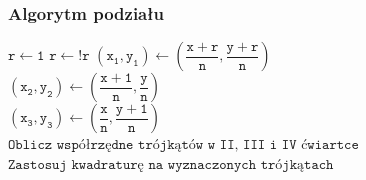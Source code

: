 \documentclass[9pt]{beamer}
\begin{document}
\begin{frame}
	\frametitle{Algorytm podziału}
	\begin{algorithmic}
			\State $\mathtt{r \gets 1}$
				\State $\mathtt{r \gets !r}$
				\State $\mathtt{(x_1,y_1) \gets (\dfrac{x+r}{n},\dfrac{y+r}{n})}$\\
				\State $\mathtt{(x_2,y_2) \gets (\dfrac{x+1}{n},\dfrac{y}{n})}$\\
				\State $\mathtt{(x_3,y_3) \gets (\dfrac{x}{n},\dfrac{y+1}{n})}$\\
				\State $\texttt{Oblicz współrzędne trójkątów w II, III i IV ćwiartce}$
				\vspace{0.5em}
				\State $\texttt{Zastosuj kwadraturę na wyznaczonych trójkątach}$
			\EndFor
		\EndFor
	\end{algorithmic}
\end{frame}
\end{document}
